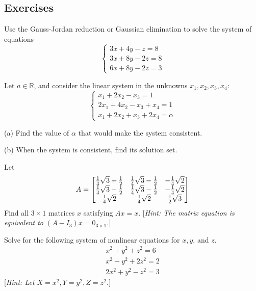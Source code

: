 \newpage
\subsection{Exercises}

\begin{problem}
Use the Gauss-Jordan reduction or Gaussian elimination to solve the system of equations
$$\begin{cases}
    3x + 4y - z  = 8 \\
    3x + 8y - 2z = 8 \\
    6x + 8y - 2z = 3
\end{cases}$$
\end{problem}

\begin{problem}
Let $a \in \mathbb{R}$, and consider the linear system in the unknowns $x_1, x_2, x_3, x_4$:
$$\begin{cases}
    x_1 +2x_2 -x_3 = 1 \\ 
    2x_1 +4x_2 -x_3 + x_4 = 1 \\
    x_1 +2x_2 +x_3 +2x_4 = \alpha
\end{cases}$$

(a) Find the value of $\alpha$ that would make the system consistent.


(b) When the system is consistent, find its solution set.

\end{problem}

\begin{problem}
Let
$$A = \begin{bmatrix} \frac{1}{4}\sqrt{3} + \frac{1}{2} & \frac{1}{4}\sqrt{3} - \frac{1}{2} & -\frac{1}{4}\sqrt{2} \\ \frac{1}{4}\sqrt{3} - \frac{1}{2} & \frac{1}{4}\sqrt{3} - \frac{1}{2} & -\frac{1}{4}\sqrt{2} \\ \frac{1}{4}\sqrt{2} & \frac{1}{4}\sqrt{2} & \frac{1}{2}\sqrt{3} \end{bmatrix}$$
Find all $3 \times 1$ matrices $x$ satisfying $Ax = x$. [\textit{Hint: The matrix equation is equivalent to $(A - I_3)x = 0_{3 \times 1}$.}]
\end{problem}

\begin{problem}
Solve for the following system of nonlinear equations for $x, y$, and $z$.
\begin{align*}
x^2 + y^2 + z^2 = 6 \\
x^2 - y^2 + 2z^2 = 2 \\
2x^2 + y^2 - z^2 = 3
\end{align*}
[\textit{Hint: Let $X = x^2, Y = y^2, Z = z^2$.}]
\end{problem}

